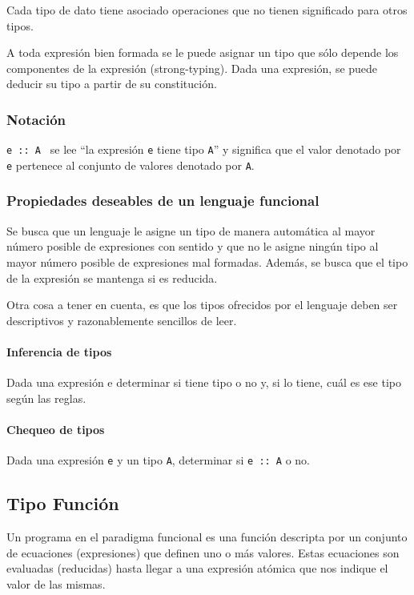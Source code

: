 Cada tipo de dato tiene asociado operaciones que no tienen significado para otros tipos.

A toda expresión bien formada se le puede asignar un tipo que sólo depende los componentes de la expresión (strong-typing). Dada una expresión, se puede deducir su tipo a partir de su constitución.

\subsubsection{Notación}  
\texttt{e :: A } se lee “la expresión \texttt{e} tiene tipo \texttt{A}” y significa que el valor denotado por \texttt{e} pertenece al conjunto de valores denotado por \texttt{A}.

\subsubsection{Propiedades deseables de un lenguaje funcional}
Se busca que un lenguaje le asigne un tipo de manera automática al mayor número posible de expresiones con sentido y que no le asigne ningún tipo al mayor número posible de expresiones mal formadas. Además, se busca que el tipo de la expresión se mantenga si es reducida.

Otra cosa a tener en cuenta, es que los tipos ofrecidos por el lenguaje deben ser descriptivos y razonablemente sencillos de leer.

\paragraph{Inferencia de tipos} Dada una expresión e determinar si tiene tipo o no y, si lo tiene, cuál es ese tipo según las reglas.

\paragraph{Chequeo de tipos} Dada una expresión \texttt{e} y un tipo \texttt{A}, determinar si \texttt{e :: A} o no.

\subsection{Tipo Función}
Un programa en el paradigma funcional es una función descripta por un conjunto de ecuaciones (expresiones) que definen uno o más valores. Estas ecuaciones son evaluadas (reducidas) hasta llegar a una expresión atómica que nos indique el valor de las mismas.

